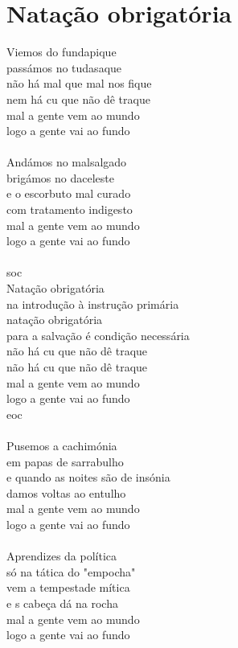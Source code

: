 \documentclass{article}
\begin{document}
\section{ Natação obrigatória}
Viemos do fundapique\\
passámos no tudasaque\\
não há mal que mal nos fique\\
nem há cu que não dê traque\\
mal a gente vem ao mundo\\
logo a gente vai ao fundo\\
\\
Andámos no malsalgado\\
brigámos no daceleste\\
e o escorbuto mal curado\\
com tratamento indigesto\\
mal a gente vem ao mundo\\
logo a gente vai ao fundo\\
\\
{soc}\\
Natação obrigatória\\
na introdução à instrução primária\\
natação obrigatória\\
para a salvação é condição necessária\\
não há cu que não dê traque\\
não há cu que não dê traque\\
mal a gente vem ao mundo\\
logo a gente vai ao fundo\\
{eoc}\\
\\
Pusemos a cachimónia\\
em papas de sarrabulho\\
e quando as noites são de insónia\\
damos voltas ao entulho\\
mal a gente vem ao mundo\\
logo a gente vai ao fundo\\
\\
Aprendizes da política\\
só na tática do "empocha"\\
vem a tempestade mítica\\
e s cabeça dá na rocha\\
mal a gente vem ao mundo\\
logo a gente vai ao fundo\\
\\
[refrão]\\
\end{document}
